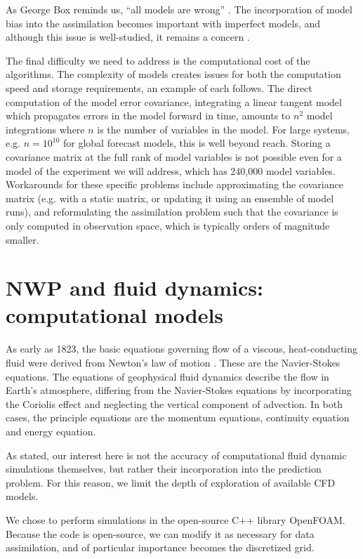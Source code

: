 As George Box reminds us, ``all models are wrong'' . 
The incorporation of model bias into the assimilation becomes important with imperfect models, and although this issue is well-studied, it remains a concern .



The final difficulty we need to address is the computational cost of the algorithms.
The complexity of models creates issues for both the computation speed and storage requirements, an example of each follows.
The direct computation of the model error covariance, integrating a linear tangent model which propagates errors in the model forward in time, amounts to $n^2$ model integrations where $n$ is the number of variables in the model.
For large systems, e.g. $n = 10^{10}$ for global forecast models, this is well beyond reach.
Storing a covariance matrix at the full rank of model variables is not possible even for a model of the experiment we will address, which has 240,000 model variables.
Workarounds for these specific problems include approximating the covariance matrix (e.g. with a static matrix, or updating it using an ensemble of model runs), and reformulating the assimilation problem such that the covariance is only computed in observation space, which is typically orders of magnitude smaller.

\section{NWP and fluid dynamics: computational models}

As early as 1823, the basic equations governing flow of a viscous, heat-conducting fluid were derived from Newton's law of motion .
These are the Navier-Stokes equations.
The equations of geophysical fluid dynamics describe the flow in Earth's atmosphere, differing from the Navier-Stokes equations by incorporating the Coriolis effect and neglecting the vertical component of advection.
In both cases, the principle equations are the momentum equations, continuity equation and energy equation.

As stated, our interest here is not the accuracy of computational fluid dynamic simulations themselves, but rather their incorporation into the prediction problem.
For this reason, we limit the depth of exploration of available CFD models.

We chose to perform simulations in the open-source C++ library OpenFOAM.
Because the code is open-source, we can modify it as necessary for data assimilation, and of particular importance becomes the discretized grid.

